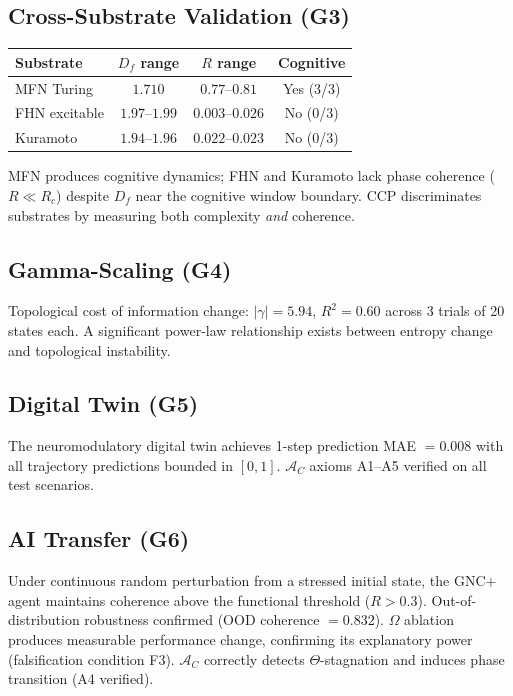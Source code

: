 \documentclass[10pt,letterpaper]{article}
\begin{document}
\subsection{Cross-Substrate Validation (G3)}

\begin{center}
\begin{tabular}{lccc}
  \toprule
  Substrate & $D_f$ range & $R$ range & Cognitive \\
  \midrule
  MFN Turing & $1.710$ & $0.77$--$0.81$ & Yes (3/3) \\
  FHN excitable & $1.97$--$1.99$ & $0.003$--$0.026$ & No (0/3) \\
  Kuramoto & $1.94$--$1.96$ & $0.022$--$0.023$ & No (0/3) \\
  \bottomrule
\end{tabular}
\end{center}
MFN produces cognitive dynamics; FHN and Kuramoto lack phase coherence
($R \ll R_c$) despite $D_f$ near the cognitive window boundary.
CCP discriminates substrates by measuring both complexity \emph{and}
coherence.

\subsection{Gamma-Scaling (G4)}

Topological cost of information change:
$|\gamma| = 5.94$, $R^2 = 0.60$ across 3 trials of 20 states each.
A significant power-law relationship exists between entropy change
and topological instability.

\subsection{Digital Twin (G5)}

The neuromodulatory digital twin achieves 1-step prediction
MAE $= 0.008$ with all trajectory predictions bounded in $[0, 1]$.
$\mathcal{A}_C$ axioms A1--A5 verified on all test scenarios.

\subsection{AI Transfer (G6)}

Under continuous random perturbation from a stressed initial state,
the GNC+ agent maintains coherence above the functional threshold
($R > 0.3$). Out-of-distribution robustness confirmed
(OOD coherence $= 0.832$). $\Omega$ ablation produces measurable
performance change, confirming its explanatory power (falsification
condition F3). $\mathcal{A}_C$ correctly detects $\Theta$-stagnation
and induces phase transition (A4 verified).
\end{document}
